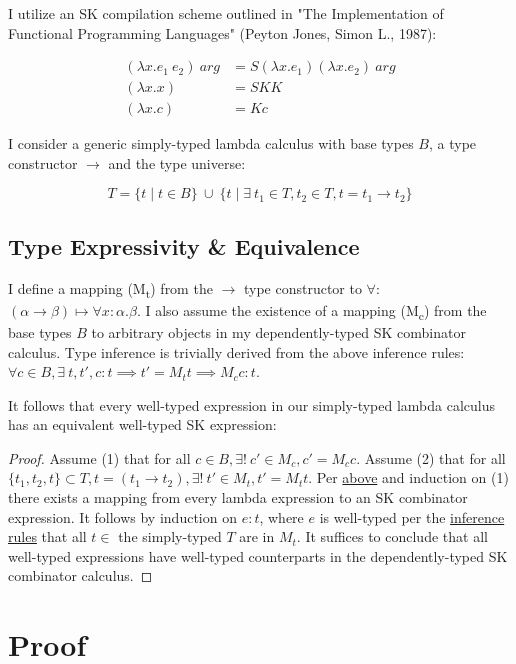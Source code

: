 \documentclass[11pt]{article}
\begin{document}
I utilize an SK compilation scheme outlined in "The Implementation of Functional Programming Languages" (Peyton Jones, Simon L., 1987):

\begin{align}
(\lambda x.e_{1}\ e_{2})\ arg &= S (\lambda x.e_{1}) (\lambda x.e_{2})\ arg \\
(\lambda x.x) &= SKK \\
(\lambda x.c) &= K c
\end{align}

I consider a generic simply-typed lambda calculus with base types \(B\), a type constructor \(\rightarrow\) and the type universe:

\[
T = \{ t \mid t \in B\}\ \cup\ \{ t \mid \exists\  t_{1} \in T, t_{2} \in T, t = t_{1} \rightarrow t_{2} \}
\]

\label{maplemma:1}
\subsection{Type Expressivity \& Equivalence}
\label{sec:org0c0cf34}

I define a mapping (M\textsubscript{t}) from the \(\rightarrow\) type constructor to \(\forall\): \((\alpha \rightarrow \beta) \mapsto \forall x : \alpha.\beta\). I also assume the existence of a mapping (M\textsubscript{c}) from the base types \(B\) to arbitrary objects in my dependently-typed SK combinator calculus. Type inference is trivially derived from the above inference rules: \(\forall c \in B, \exists\ t, t', c : t \implies t' = M_{t} t \implies M_{c} c : t\).

It follows that every well-typed expression in our simply-typed lambda calculus has an equivalent well-typed SK expression:

\begin{proof}
Assume (1) that for all $c \in B, \exists!\ c' \in M_{c}, c' = M_{c} c$.
Assume (2) that for all $\{t_{1}, t_{2}, t\} \subset T, t = (t_{1} \rightarrow t_{2}), \exists!\ t' \in M_{t}, t' = M_{t} t$.
Per \href{decomplemma:1}{above} and induction on (1) there exists a mapping from every lambda expression to an SK combinator expression.
It follows by induction on $e : t$, where $e$ is well-typed per the \href{decomplemma:1}{inference rules} that all $t \in$ the simply-typed $T$ are in $M_{t}$.
It suffices to conclude that all well-typed expressions have well-typed counterparts in the dependently-typed SK combinator calculus.
\end{proof}
\section{Proof}
\label{sec:orgd8194f3}
\end{document}
